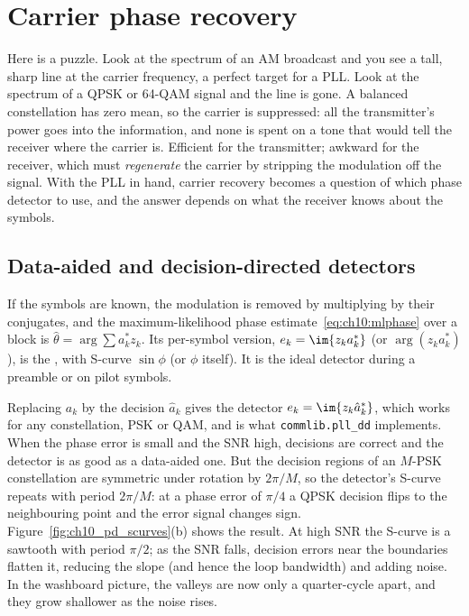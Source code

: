 \section{Carrier phase recovery}
\label{sec:ch10:carrier}

Here is a puzzle. Look at the spectrum of an AM broadcast and you see a tall, sharp line at the
carrier frequency, a perfect target for a PLL. Look at the spectrum of a QPSK or 64-QAM signal
and the line is gone. A balanced constellation has zero mean, so the carrier is suppressed:
all the transmitter's power goes into the information, and none is spent on a tone that would
tell the receiver where the carrier is. Efficient for the transmitter; awkward for the receiver,
which must \emph{regenerate} the carrier by stripping the modulation off the signal. With the PLL
in hand, carrier recovery becomes a question of which phase detector to use, and the answer
depends on what the receiver knows about the symbols.

\subsection{Data-aided and decision-directed detectors}

If the symbols are known, the modulation is removed by multiplying by their conjugates, and the
maximum-likelihood phase estimate~\eqref{eq:ch10:mlphase} over a block is
$\hat\theta=\arg\sum a_k^*z_k$. Its per-symbol version, $e_k=\im\{z_ka_k^*\}$ (or $\arg(z_ka_k^*)$),
is the , with S-curve $\sin\phi$ (or $\phi$ itself). It is the ideal
detector during a preamble or on pilot symbols.

Replacing $a_k$ by the decision $\hat a_k$ gives the  detector
$e_k=\im\{z_k\hat a_k^*\}$, which works for any constellation, PSK or QAM, and is what
\texttt{commlib.pll\_dd} implements. When the phase error is small and the SNR high, decisions are
correct and the detector is as good as a data-aided one. But the decision regions of an $M$-PSK
constellation are symmetric under rotation by $2\pi/M$, so the detector's S-curve repeats with period
$2\pi/M$: at a phase error of $\pi/4$ a QPSK decision flips to the neighbouring point and the error
signal changes sign. Figure~\ref{fig:ch10_pd_scurves}(b) shows the result. At high SNR the S-curve is a
sawtooth with period $\pi/2$; as the SNR falls, decision errors near the boundaries flatten it,
reducing the slope (and hence the loop bandwidth) and adding noise. In the washboard picture, the
valleys are now only a quarter-cycle apart, and they grow shallower as the noise rises.


